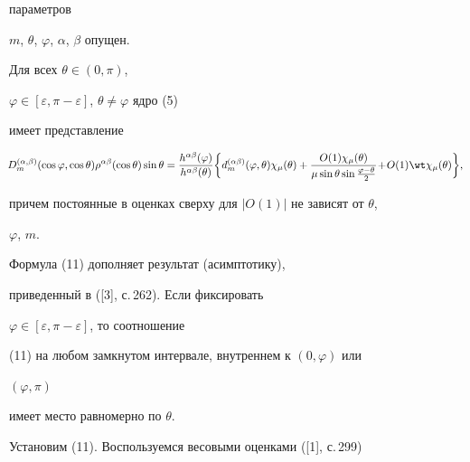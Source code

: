 параметров 


$m$, $\theta$, $\varphi$, $\alpha$, $\beta$ опущен. 


 


\begin{lem} Для всех $\theta\in(0,\pi)$, 


$\varphi\in[\varepsilon,\pi-\varepsilon]$, $\theta\ne\varphi$ ядро (5) 


имеет представление 


\begin{equation} 


\negthickspace D^{(\alpha,\beta)}_m(\cos\varphi,\cos\theta) 


\rho^{\alpha\beta}(\cos\theta)\sin\theta= 


\frac{h^{\alpha\beta}(\varphi)}{h^{\alpha\beta}(\theta)} 


\bigg\{d^{(\alpha\beta)}_m(\varphi,\theta)\chi_\mu(\theta)+ 


\frac{O(1)\chi_\mu(\theta)} 


{\mu\sin\theta\sin\frac{\varphi-\theta}{2}}\!+\!


O(1)\wt\chi_\mu(\theta)\bigg\}, 


\end{equation} 


причем постоянные в оценках сверху для $|O(1)|$ не зависят от $\theta$, 


$\varphi$, $m$. 


\end{lem} 


 


\begin{notenonum} 


Формула (11) дополняет результат (асимптотику), 


приведенный в ([3], с.\,262). Если фиксировать 


$\varphi\in[\varepsilon,\pi-\varepsilon]$, то соотношение 


(11) на любом замкнутом интервале, внутреннем к $(0,\varphi)$ или 


$(\varphi,\pi)$ 


имеет место равномерно по $\theta$. 


\end{notenonum} 


 


Установим (11). Воспользуемся весовыми оценками ([1], с.\,299) 


